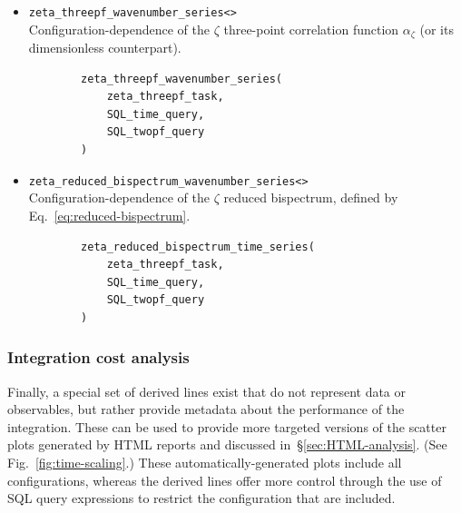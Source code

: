 \documentclass[11pt,a4paper]{article}
\begin{document}
\begin{itemize}
    \item \texttt{zeta_threepf_wavenumber_series<>} \\
    Configuration-dependence
    of the $\zeta$ three-point correlation function $\alpha_\zeta$
    (or its dimensionless counterpart).
    \begin{verbatim}
        zeta_threepf_wavenumber_series(    
            zeta_threepf_task,
            SQL_time_query,
            SQL_twopf_query
        )
    \end{verbatim}
    
    \item \texttt{zeta_reduced_bispectrum_wavenumber_series<>} \\
    Configuration-dependence of the $\zeta$ reduced bispectrum, defined by
    Eq.~\eqref{eq:reduced-bispectrum}.
    \begin{verbatim}
        zeta_reduced_bispectrum_time_series(    
            zeta_threepf_task,
            SQL_time_query,
            SQL_twopf_query
        )
    \end{verbatim}

\end{itemize}

\subsubsection{Integration cost analysis}

Finally, a special set of derived lines exist that do not represent
data or observables, but rather provide metadata about the
performance of the integration.
These can be used to provide more targeted versions of the
scatter plots generated by HTML reports
and discussed in~\S\ref{sec:HTML-analysis}.
(See Fig.~\ref{fig:time-scaling}.)
These automatically-generated plots include all configurations,
whereas the derived lines offer more control through the use of SQL
query expressions to restrict the configuration that are included.
\end{document}
